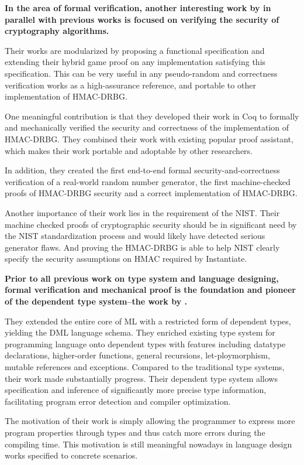 \documentclass{article}
\begin{document}
\textbf{In the area of formal verification, another interesting work by \cite{ye2017verified} in parallel with previous works is focused on verifying the security of cryptography algorithms.}

Their works are modularized by proposing a functional specification and extending their hybrid game proof on any implementation satisfying this specification. This can be very useful in any pseudo-random and correctness verification works as a high-assurance reference, and portable to other implementation of HMAC-DRBG.

One meaningful contribution is that they developed their work in Coq to formally and mechanically verified the security and correctness of the implementation of HMAC-DRBG. They combined their work with existing popular proof assistant, which makes their work portable and adoptable by other researchers.

In addition, they created the first end-to-end formal security-and-correctness verification of a real-world random number generator, the first machine-checked proofs of HMAC-DRBG security and a correct implementation of HMAC-DRBG. 

Another importance of their work lies in the requirement of the NIST. Their machine checked proofs of cryptographic security should be in significant need by the NIST standardization process and would likely have detected serious generator flaws. And proving the HMAC-DRBG is able to help NIST clearly specify the security assumptions on HMAC required by Instantiate.


\textbf{Prior to all previous work on type system and language designing, formal verification and mechanical proof is the foundation and pioneer of the dependent type system--the work by \cite{xi1999dependent}.}

They extended the entire core of ML with a restricted form of dependent types, yielding the DML language schema. They enriched existing type system for programming language onto dependent types with features including datatype declarations, higher-order functions, general recursions, let-ploymorphism, mutable references and exceptions. 
Compared to the traditional type systems, their work made substantially progress.
Their dependent type system allows specification and inference of significantly more precise type information, facilitating program error detection and compiler optimization.

The motivation of their work is simply allowing the programmer to express more program properties through types and thus catch more errors during the compiling time. This motivation is still meaningful nowadays in language design works specified to concrete scenarios.
\end{document}
